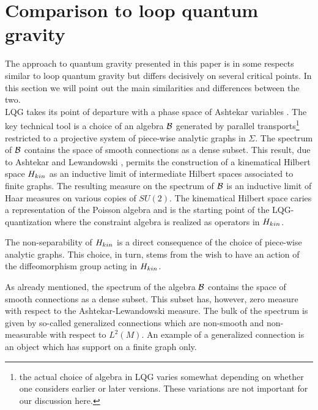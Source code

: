 \documentclass[12pt]{article}
\def\S{\Sigma}
\def\cb{{\cal B}}
\begin{document}
\section{Comparison to loop quantum gravity}






The approach to quantum gravity presented in this paper is in some respects similar to loop quantum gravity \cite{AL1,Thiemann:2001yy,Sahlmann:2010zf} but differs decisively on several critical points. In this section we will point out the main similarities and differences between the two.\\

LQG takes its point of departure with a phase space of Ashtekar variables \cite{Ashtekar:1986yd,Ashtekar:1987gu}. The key technical tool is a choice of an algebra $\cb$ generated by parallel transports\footnote{the actual choice of algebra in LQG varies somewhat depending on whether one considers earlier or later versions. These variations are not important for our discussion here.} restricted to a projective system of piece-wise analytic graphs in $\S$. The spectrum of $\cb$ contains the space of smooth connections as a dense subset. This result, due to Ashtekar and Lewandowski \cite{Ashtekar:1993wf}, permits the construction of a kinematical Hilbert space $H_{\tiny kin}$ as an inductive limit of intermediate Hilbert spaces associated to finite graphs. The resulting measure on the spectrum of $\cb$ is an inductive limit of Haar measures on various copies of $SU(2)$.
 The kinematical Hilbert space caries a representation of the Poisson algebra and is the starting point of the LQG-quantization where the constraint algebra is realized as operators in $H_{\tiny kin}$.


The non-separability of $H_{\tiny kin}$ is a direct consequence of the choice of piece-wise analytic graphs. This choice, in turn, stems from the wish to have an action of the diffeomorphism group acting in $H_{\tiny kin}$. 


As already mentioned, the spectrum of the algebra $\cb$ contains the space of smooth connections as a dense subset. This subset has, however, zero measure with respect to the Ashtekar-Lewandowski measure. The bulk of the spectrum is given by so-called generalized connections which are non-smooth and non-measurable with respect to $L^2(M)$. An example of a generalized connection is an object which has support on a finite graph only.
\end{document}

